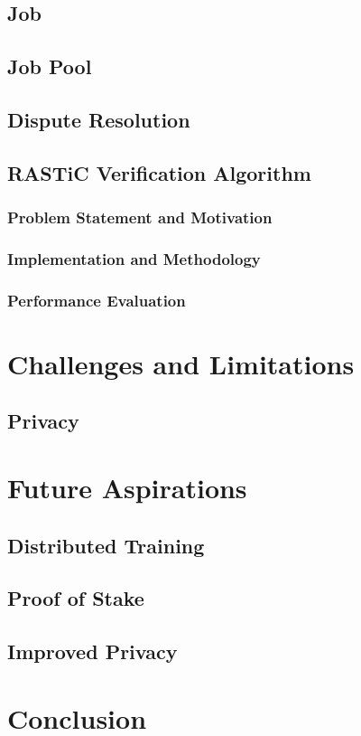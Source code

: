 \documentclass{article}
\begin{document}
\subsection{Job}
\subsection{Job Pool}
\subsection{Dispute Resolution}

\subsection{RASTiC Verification Algorithm}
\subsubsection{Problem Statement and Motivation}
\subsubsection{Implementation and Methodology}
\subsubsection{Performance Evaluation}

\section{Challenges and Limitations}
\subsection{Privacy}

\section {Future Aspirations}
\subsection{Distributed Training}
\subsection{Proof of Stake}
\subsection{Improved Privacy}                                                                                                                                                                       
                                        
\section{Conclusion}
\end{document}
